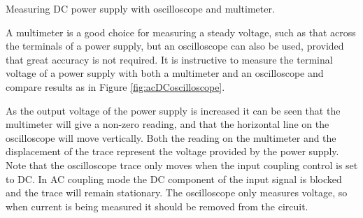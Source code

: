 \begin{marginfigure}
\caption{Measuring DC power supply with oscilloscope and multimeter.}
\label{fig:acDCoscilloscope}
\end{marginfigure}


A multimeter is a good choice for measuring a steady voltage, such as that across the terminals of a power supply, but an oscilloscope can also be used, provided that great accuracy is not required. It is instructive to measure the terminal voltage of a power supply with both a multimeter and an oscilloscope and compare results as in Figure \ref{fig:acDCoscilloscope}.

As the output voltage of the power supply is increased it can be seen that the multimeter will give a non-zero reading, and that the horizontal line on the oscilloscope will move vertically. Both the reading on the multimeter and the displacement of the trace represent the voltage provided by the power supply. Note that the oscilloscope trace  only moves when the input coupling control is set to DC. In AC coupling mode the DC component of the input signal is blocked and the trace will remain stationary. The oscilloscope only measures voltage, so when current is being measured it should be removed from the circuit.


